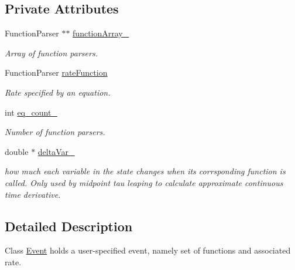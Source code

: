 \subsection*{Private Attributes}
\begin{DoxyCompactItemize}
\item 
\mbox{\label{class_event_a77f230a68021756fd1e2d35dcfa534f8}} 
Function\+Parser $\ast$$\ast$ \hyperlink{class_event_a77f230a68021756fd1e2d35dcfa534f8}{function\+Array\+\_\+}
\begin{DoxyCompactList}\small\item\em Array of function parsers. \end{DoxyCompactList}\item 
\mbox{\label{class_event_a5a82a70465e39626ad62d1cfe3fc7617}} 
Function\+Parser \hyperlink{class_event_a5a82a70465e39626ad62d1cfe3fc7617}{rate\+Function}
\begin{DoxyCompactList}\small\item\em Rate specified by an equation. \end{DoxyCompactList}\item 
\mbox{\label{class_event_a59244ccd0e0f3654f07715bb3dd6423f}} 
int \hyperlink{class_event_a59244ccd0e0f3654f07715bb3dd6423f}{eq\+\_\+count\+\_\+}
\begin{DoxyCompactList}\small\item\em Number of function parsers. \end{DoxyCompactList}\item 
\mbox{\label{class_event_a869e25f5b77f85372eb0397ea01e25bf}} 
double $\ast$ \hyperlink{class_event_a869e25f5b77f85372eb0397ea01e25bf}{delta\+Var\+\_\+}
\begin{DoxyCompactList}\small\item\em how much each variable in the state changes when its corrsponding function is called. Only used by midpoint tau leaping to calculate approximate continuous time derivative. \end{DoxyCompactList}\end{DoxyCompactItemize}


\subsection{Detailed Description}
Class \hyperlink{class_event}{Event} holds a user-\/specified event, namely set of functions and associated rate. 

